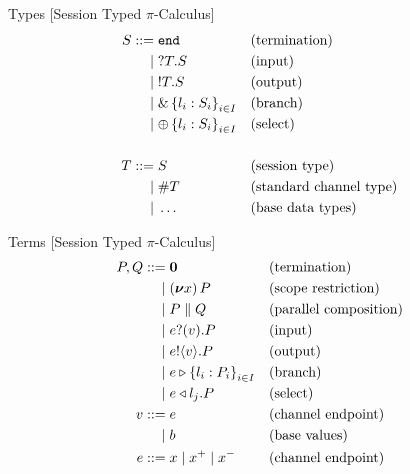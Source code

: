 \documentclass[dvipsnames]{beamer}
\newcommand{\Picalc}{$\pi$-Calculus}
\newcommand{\PO}{\boldsymbol{0}}
\newcommand{\comp}[2]{#1 \parallel #2}
\newcommand{\new}[1]{(\boldsymbol{\nu} #1) \,}
\newcommand{\send}[2]{#1 !\langle #2 \rangle .}
\newcommand{\recv}[2]{#1 ?( #2 ) .}
\newcommand{\branch}[3]{#1 \triangleright \left\{l_{#2} : #3_{#2}\right\}_{#2 \in \uppercase{#2}}}
\newcommand{\select}[2]{#1 \triangleleft l_{#2} .}
\newcommand{\type}[1]{\mathtt{#1}}
\newcommand{\tend}[0]{\type{end}}
\newcommand{\trecv}[1]{\type{?} #1 \type{.}}
\newcommand{\tsend}[1]{\type{!} #1 \type{.}}
\newcommand{\tbranch}[2]{\type{\&} \left\{l_{#1} : #2\right\}_{#1 \in \uppercase{#1}}}
\newcommand{\tselect}[2]{\type{\oplus} \left\{l_{#1} : #2\right\}_{#1 \in \uppercase{#1}}}
\newcommand{\tchannel}[0]{\type{\#}}
\newcommand{\slidetitle}[2]{#2 \hspace*{\fill} [#1]}
\begin{document}
  \begin{frame}{\slidetitle{Session Typed \Picalc{}}{Types}}
    \begin{equation*}
      \begin{aligned}
        S ::=& \; \tend      &&\text{(termination)}    \\ 
        |& \; \trecv{T}S     &&\text{(input)}       \\ 
        |& \; \tsend{T}S     &&\text{(output)}       \\           
        |& \; \tbranch{i}{S_i} &&\text{(branch)}       \\ 
        |& \; \tselect{i}{S_i} &&\text{(select)}       \\           
        \\
        T ::=& \; S      &&\text{(session type)} \\
        | & \; \tchannel T && \text{(standard channel type)} \\
        | & \; \ldots      &&\text{(base data types)} \\
      \end{aligned}
    \end{equation*}
  \end{frame}

  \begin{frame}{\slidetitle{Session Typed \Picalc{}}{Terms}}
    \begin{equation*}
      \begin{aligned}
        P, Q ::=& \; \PO       &&\text{(termination)}    \\ 
        |& \; \new{x}P         &&\text{(scope restriction)} \\ 
        |& \; \comp{P}{Q}      &&\text{(parallel composition)} \\ 
        |& \; \recv{e}{v}P     &&\text{(input)}       \\ 
        |& \; \send{e}{v}P     &&\text{(output)}       \\           
        |& \; \branch{e}{i}{P} &&\text{(branch)}       \\ 
        |& \; \select{e}{j}P   &&\text{(select)}       \\           
        v ::=& \; e && \text{(channel endpoint)}\\
        |& \; b && \text{(base values)}\\
        e ::=& \; x \; | \; x^+ \; | \; x^- && \text{(channel endpoint)}\\
      \end{aligned}
    \end{equation*}
  \end{frame}
\end{document}
